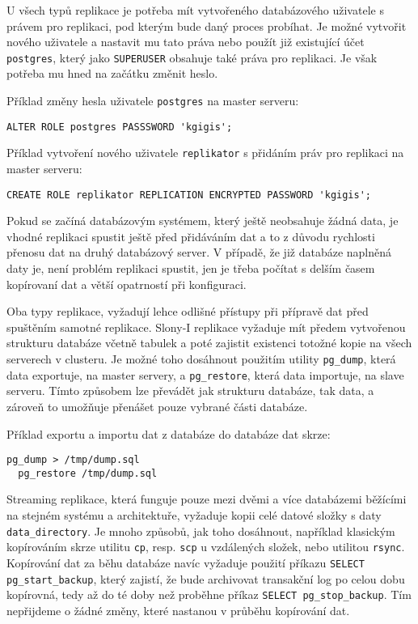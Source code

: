       U všech typů replikace je potřeba mít vytvořeného databázového uživatele s právem pro replikaci, pod kterým bude daný proces probíhat. Je možné vytvořit nového uživatele a nastavit mu tato práva nebo použít již existující účet \texttt{postgres}, který jako \texttt{SUPERUSER} obsahuje také práva pro replikaci. Je však potřeba mu hned na začátku změnit heslo.

Příklad změny hesla uživatele \texttt{postgres} na master serveru:
\begin{lstlisting}
ALTER ROLE postgres PASSSWORD 'kgigis';
\end{lstlisting}

Příklad vytvoření nového uživatele \texttt{replikator} s přidáním práv pro replikaci na master serveru: 
\begin{lstlisting}
CREATE ROLE replikator REPLICATION ENCRYPTED PASSWORD 'kgigis';
\end{lstlisting}

Pokud se začíná databázovým systémem, který ještě neobsahuje žádná data, je vhodné replikaci spustit ještě před přidáváním dat a to z důvodu rychlosti přenosu dat na druhý databázový server. V případě, že již databáze naplněná daty je, není problém replikaci spustit, jen je třeba počítat s delším časem kopírovaní dat a větší opatrností při konfiguraci. 

Oba typy replikace, vyžadují lehce odlišné přístupy při přípravě dat před spuštěním samotné replikace. 
Slony-I replikace vyžaduje mít předem vytvořenou strukturu databáze včetně tabulek a poté zajistit existenci totožné kopie na všech serverech v clusteru. Je možné toho dosáhnout použitím utility \texttt{pg\_dump}, která data exportuje, na master servery, a \texttt{pg\_restore}, která data importuje, na slave serveru. Tímto způsobem lze převádět jak strukturu databáze, tak data, a zároveň to umožňuje přenášet pouze vybrané části databáze. 

Příklad exportu a importu dat z databáze do databáze dat skrze:
\begin{lstlisting}[keywordstyle=\color{purpurova7},identifierstyle=\color{black},stringstyle=\color{black}]
  pg_dump > /tmp/dump.sql
  pg_restore /tmp/dump.sql
\end{lstlisting}

Streaming replikace, která funguje pouze mezi dvěmi a více databázemi běžícími na stejném systému a architektuře, vyžaduje kopii celé datové složky s daty \texttt{data\_directory}. Je mnoho způsobů, jak toho dosáhnout, například klasickým kopírováním skrze utilitu \texttt{cp}, resp. \texttt{scp} u vzdálených složek, nebo utilitou \texttt{rsync}. Kopírování dat za běhu databáze navíc vyžaduje použití příkazu \texttt{SELECT pg\_start\_backup}, který zajistí, že bude archivovat transakční log po celou dobu kopírovná, tedy až do té doby než proběhne příkaz \texttt{SELECT pg\_stop\_backup}. Tím nepřijdeme o žádné změny, které nastanou v průběhu kopírování dat.

